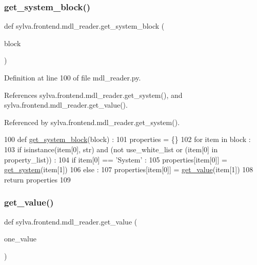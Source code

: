 \subsubsection{\texorpdfstring{get\+\_\+system\+\_\+block()}{get\_system\_block()}}
{\footnotesize\ttfamily def sylva.\+frontend.\+mdl\+\_\+reader.\+get\+\_\+system\+\_\+block (\begin{DoxyParamCaption}\item[{}]{block }\end{DoxyParamCaption})}



Definition at line 100 of file mdl\+\_\+reader.\+py.



References sylva.\+frontend.\+mdl\+\_\+reader.\+get\+\_\+system(), and sylva.\+frontend.\+mdl\+\_\+reader.\+get\+\_\+value().



Referenced by sylva.\+frontend.\+mdl\+\_\+reader.\+get\+\_\+system().


\begin{DoxyCode}
100   \textcolor{keyword}{def }\hyperlink{namespacesylva_1_1frontend_1_1mdl__reader_ae055d388934ef992b5b05417b47b2940}{get\_system\_block}(block) :
101     properties = \{\}
102     \textcolor{keywordflow}{for} item \textcolor{keywordflow}{in} block :
103       \textcolor{keywordflow}{if} isinstance(item[0], str) \textcolor{keywordflow}{and} (\textcolor{keywordflow}{not} use\_white\_list \textcolor{keywordflow}{or} (item[0] \textcolor{keywordflow}{in} property\_list)) :
104         \textcolor{keywordflow}{if} item[0] == \textcolor{stringliteral}{'System'} :
105           properties[item[0]] = \hyperlink{namespacesylva_1_1frontend_1_1mdl__reader_a51ec6ceefd4c16f0d3d80edbdc40c0e9}{get\_system}(item[1])
106         \textcolor{keywordflow}{else} :
107           properties[item[0]] = \hyperlink{namespacesylva_1_1frontend_1_1mdl__reader_a1109464081a5fe17543fc36a494625bd}{get\_value}(item[1])
108     \textcolor{keywordflow}{return} properties
109 
\end{DoxyCode}
\mbox{\label{namespacesylva_1_1frontend_1_1mdl__reader_a1109464081a5fe17543fc36a494625bd}} 
\subsubsection{\texorpdfstring{get\+\_\+value()}{get\_value()}}
{\footnotesize\ttfamily def sylva.\+frontend.\+mdl\+\_\+reader.\+get\+\_\+value (\begin{DoxyParamCaption}\item[{}]{one\+\_\+value }\end{DoxyParamCaption})}



